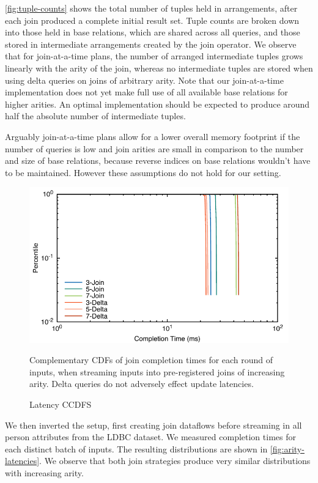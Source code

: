 \documentclass[../catalog.tex]{subfiles}
\begin{document}
\autoref{fig:tuple-counts} shows the total number of tuples held in
arrangements, after each join produced a complete initial result
set. Tuple counts are broken down into those held in base relations,
which are shared across all queries, and those stored in intermediate
arrangements created by the join operator. We observe that for
join-at-a-time plans, the number of arranged intermediate tuples grows
linearly with the arity of the join, whereas no intermediate tuples
are stored when using delta queries on joins of arbitrary arity. Note
that our join-at-a-time implementation does not yet make full use of
all available base relations for higher arities. An optimal
implementation should be expected to produce around half the absolute
number of intermediate tuples.

Arguably join-at-a-time plans allow for a lower overall memory
footprint if the number of queries is low and join arities are small
in comparison to the number and size of base relations, because
reverse indices on base relations wouldn't have to be
maintained. However these assumptions do not hold for our setting.

\begin{figure}[h!]
  \includegraphics[width=1.0\linewidth]{results/join-state/out/all_cdfs}
  \caption{Latency CCDFS}
  \label{fig:arity-latencies}
  \medskip
  \small

  Complementary CDFs of join completion times for each round of
  inputs, when streaming inputs into pre-registered joins of
  increasing arity. Delta queries do not adversely effect update
  latencies.
\end{figure}

We then inverted the setup, first creating join dataflows before
streaming in all person attributes from the LDBC dataset. We measured
completion times for each distinct batch of inputs. The resulting
distributions are shown in \autoref{fig:arity-latencies}. We observe
that both join strategies produce very similar distributions with
increasing arity.
\end{document}
